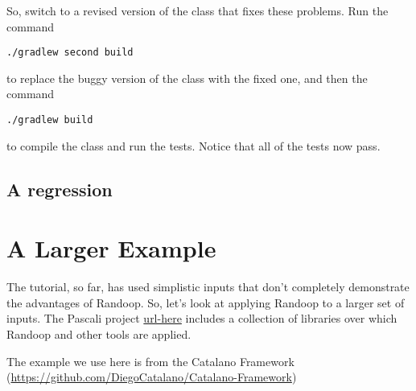 \documentclass[11pt, oneside]{article} %
\begin{document}
So, switch to a revised version of the class that fixes these problems.
Run the command
\begin{verbatim}
./gradlew second build
\end{verbatim}
to replace the buggy version of the class with the fixed one, and then the command
\begin{verbatim}
./gradlew build
\end{verbatim}
to compile the class and run the tests. 
Notice that all of the tests now pass.

\subsection{A regression}

\section{A Larger Example}\label{largerexample}
The tutorial, so far, has used simplistic inputs that don't completely demonstrate the advantages of Randoop. 
So, let's look at applying Randoop to a larger set of inputs.
The Pascali project \url{url-here} includes a collection of libraries over which Randoop and other tools are applied. 

The example we use here is from the Catalano Framework (\url{https://github.com/DiegoCatalano/Catalano-Framework})
\end{document}
